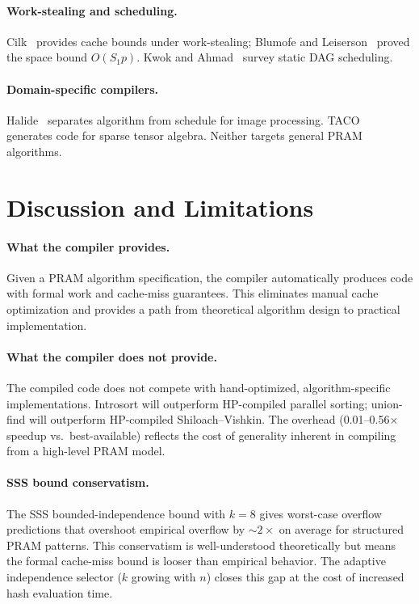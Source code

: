 \documentclass[11pt]{article}
\begin{document}
\paragraph{Work-stealing and scheduling.}
Cilk~\cite{frigo1998implementation} provides cache bounds under
work-stealing; Blumofe and Leiserson~\cite{blumofe1999scheduling}
proved the space bound $O(S_1 p)$.  Kwok and
Ahmad~\cite{kwok1999static} survey static DAG scheduling.

\paragraph{Domain-specific compilers.}
Halide~\cite{ragan2013halide} separates algorithm from schedule for
image processing.  TACO~\cite{kjolstad2017tensor} generates code for
sparse tensor algebra.  Neither targets general PRAM algorithms.

\section{Discussion and Limitations}
\label{sec:discussion}

\paragraph{What the compiler provides.}
Given a PRAM algorithm specification, the compiler automatically produces
code with formal work and cache-miss guarantees.  This eliminates
manual cache optimization and provides a path from theoretical algorithm
design to practical implementation.

\paragraph{What the compiler does not provide.}
The compiled code does not compete with hand-optimized, algorithm-specific
implementations.  Introsort will outperform HP-compiled parallel sorting;
union-find will outperform HP-compiled Shiloach--Vishkin.  The overhead
(0.01--0.56$\times$ speedup vs.\ best-available) reflects the cost of
generality inherent in compiling from a high-level PRAM model.

\paragraph{SSS bound conservatism.}
The SSS bounded-independence bound with $k = 8$ gives worst-case overflow
predictions that overshoot empirical overflow by ${\sim}2\times$ on
average for structured PRAM patterns.  This conservatism is well-understood
theoretically but means the formal cache-miss bound is looser than
empirical behavior.  The adaptive independence selector ($k$ growing with
$n$) closes this gap at the cost of increased hash evaluation time.
\end{document}
